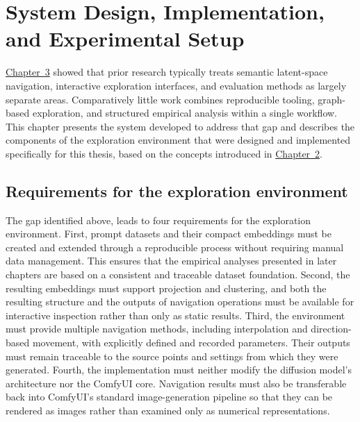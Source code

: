 \chapter{System Design, Implementation, and Experimental Setup}\label{ch:system-design}

\hyperref[ch:related-work]{Chapter~3} showed that prior research typically treats semantic latent-space navigation, interactive exploration interfaces, and evaluation methods as largely separate areas. Comparatively little work combines reproducible tooling, graph-based exploration, and structured empirical analysis within a single workflow. This chapter presents the system developed to address that gap and describes the components of the exploration environment that were designed and implemented specifically for this thesis, based on the concepts introduced in \hyperref[ch:foundations]{Chapter~2}.

\section{Requirements for the exploration environment}\label{sec:4.1}

The gap identified above, leads to four requirements for the exploration environment. First, prompt datasets and their compact embeddings must be created and extended through a reproducible process without requiring manual data management. This ensures that the empirical analyses presented in later chapters are based on a consistent and traceable dataset foundation. Second, the resulting embeddings must support projection and clustering, and both the resulting structure and the outputs of navigation operations must be available for interactive inspection rather than only as static results. Third, the environment must provide multiple navigation methods, including interpolation and direction-based movement, with explicitly defined and recorded parameters. Their outputs must remain traceable to the source points and settings from which they were generated. Fourth, the implementation must neither modify the diffusion model's architecture nor the ComfyUI core. Navigation results must also be transferable back into ComfyUI's standard image-generation pipeline so that they can be rendered as images rather than examined only as numerical representations.

